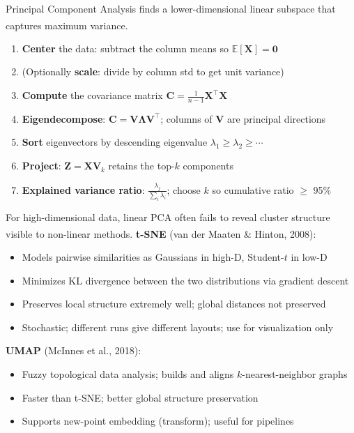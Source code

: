\begin{tcbitemize}[ skin=sectionraster ]
    \tcbitem[title={PCA Step-by-Step}, raster multicolumn=3]
    Principal Component Analysis finds a lower-dimensional linear subspace that captures maximum variance\textsuperscript{\cite{hastieElementsStatisticalLearning2008}}.
    \tcblower
    \begin{enumerate}
        \item \textbf{Center} the data: subtract the column means so $\mathbb{E}[\mathbf{X}] = \mathbf{0}$
        \item (Optionally \textbf{scale}: divide by column std to get unit variance)
        \item \textbf{Compute} the covariance matrix $\mathbf{C} = \frac{1}{n-1}\mathbf{X}^\top\mathbf{X}$
        \item \textbf{Eigendecompose}: $\mathbf{C} =
              \mathbf{V}\boldsymbol{\Lambda}\mathbf{V}^\top$; columns of
              $\mathbf{V}$ are principal directions
        \item \textbf{Sort} eigenvectors by descending eigenvalue $\lambda_1 \geq \lambda_2 \geq \cdots$
        \item \textbf{Project}: $\mathbf{Z} = \mathbf{X}\mathbf{V}_k$ retains the top-$k$ components
        \item \textbf{Explained variance ratio}: $\frac{\lambda_j}{\sum_i \lambda_i}$; choose $k$ so cumulative ratio $\geq$ 95\%
    \end{enumerate}

    \tcbitem[title={t-SNE \& UMAP}, raster multicolumn=3]
    For high-dimensional data, linear PCA often fails to reveal cluster structure visible to non-linear methods\textsuperscript{\cite{hastieElementsStatisticalLearning2008}}.
    \tcblower
    \textbf{t-SNE} (van der Maaten \& Hinton, 2008):
    \begin{itemize}
        \item Models pairwise similarities as Gaussians in high-D, Student-$t$ in low-D
        \item Minimizes KL divergence between the two distributions via gradient descent
        \item Preserves local structure extremely well; global distances not preserved
        \item Stochastic; different runs give different layouts; use for visualization only
    \end{itemize}
    \textbf{UMAP} (McInnes et al., 2018):
    \begin{itemize}
        \item Fuzzy topological data analysis; builds and aligns $k$-nearest-neighbor graphs
        \item Faster than t-SNE; better global structure preservation
        \item Supports new-point embedding (transform); useful for pipelines
    \end{itemize}
\end{tcbitemize}

